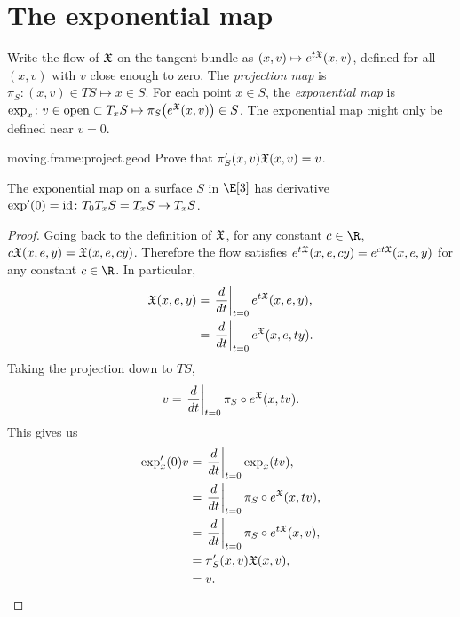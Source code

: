 \section{The exponential map}\label{section:geodesics.exponential.map}
Write the flow of \(\mathfrak{X}\) on the tangent bundle as \((x,v)\mapsto e^{t\mathfrak{X}}(x,v)\), defined for all \((x,v)\) with \(v\) close enough to zero.
The \emph{projection map} is \(\pi_S \colon (x,v) \in TS \mapsto x \in S\).
For each point \(x \in S\), the \emph{exponential map}%
is \(\exp_x \colon v \in \operatorname{open} \subset T_x S \mapsto \pi_S\!\left(e^{\mathfrak{X}}(x,v)\right) \in S\).
The exponential map might only be defined near \(v=0\).
\begin{problem}{moving.frame:project.geod}
Prove that \(\pi_S'(x,v)\mathfrak{X}(x,v)=v\).
\end{problem}
\begin{lemma}
The exponential map on a surface \(S\) in \(\E[3]\) has derivative \(\exp'(0)=\operatorname{id} \colon T_0 T_x S = T_x S \to T_x S\).
\end{lemma}
\begin{proof}
Going back to the definition of \(\mathfrak{X}\), for any constant \(c \in \R\), \(c\mathfrak{X}(x,e,y)=\mathfrak{X}(x,e,cy)\).
Therefore the flow satisfies \(e^{t\mathfrak{X}}(x,e,cy)=e^{ct\mathfrak{X}}(x,e,y)\) for any constant \(c \in \R\).
In particular, 
\begin{align*}
\mathfrak{X}(x,e,y)
&=
\left.\frac{d}{dt}\right|_{t=0} e^{t\mathfrak{X}}(x,e,y),
\\
&=
\left.\frac{d}{dt}\right|_{t=0} e^{\mathfrak{X}}(x,e,ty).
\end{align*}
Taking the projection down to \(TS\),
\[
v = \left.\frac{d}{dt}\right|_{t=0} \pi_S \circ e^{\mathfrak{X}}(x,tv).
\]
This gives us
\begin{align*}
\exp'_x(0)v 
&=
\left.\frac{d}{dt}\right|_{t=0}
\exp_x(tv),
\\
&=
\left.\frac{d}{dt}\right|_{t=0}
\pi_S \circ e^{\mathfrak{X}}(x,tv),
\\
&=
\left.\frac{d}{dt}\right|_{t=0}
\pi_S \circ e^{t\mathfrak{X}}(x,v),
\\
&=
\pi_S'(x,v) \mathfrak{X}(x,v),
\\
&=
v.
\end{align*}
\end{proof}

